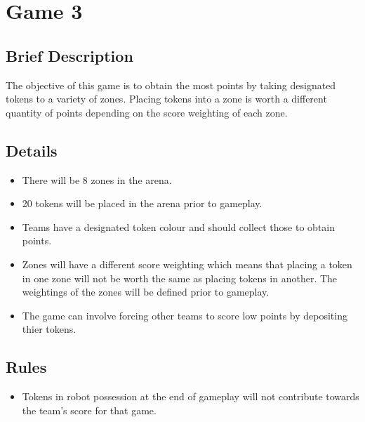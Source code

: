 \section {Game 3}

\subsection {Brief Description}

The objective of this game is to obtain the most points by taking designated tokens to a variety of zones. Placing tokens into a zone is worth a different quantity of points depending on the score weighting of each zone.

\subsection {Details}

\begin {itemize}

\item There will be 8 zones in the arena.
\item 20 tokens will be placed in the arena prior to gameplay.
\item Teams have a designated token colour and should collect those to obtain points.
\item Zones will have a different score weighting which means that placing a token in one zone will not be worth the same as placing tokens in another. The weightings of the zones will be defined prior to gameplay.
\item The game can involve forcing other teams to score low points by depositing thier tokens. 

\end {itemize}

\subsection {Rules}

\begin {itemize}

\item Tokens in robot possession at the end of gameplay will not contribute towards the team's score for that game.

\end {itemize}
